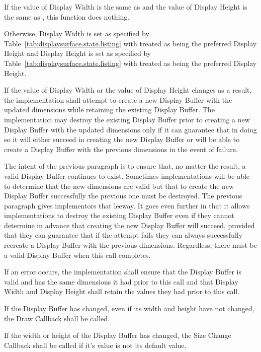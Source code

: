 \begin{itemdescr}
\pnum
\effects
If the value of Display Width is the same as  and the value of Display Height is the same as , this function does nothing.

\pnum
Otherwise, Display Width is set as specified by Table~\ref{tab:displaysurface.state.listing} with  treated as being the preferred Display Height and Display Height is set as specified by Table~\ref{tab:displaysurface.state.listing} with  treated as being the preferred Display Height.

\pnum
If the value of Display Width or the value of Display Height changes as a result, the implementation shall attempt to create a new Display Buffer with the updated dimensions while retaining the existing Display Buffer. The implementation may destroy the existing Display Buffer prior to creating a new Display Buffer with the updated dimensions only if it can guarantee that in doing so it will either succeed in creating the new Display Buffer or will be able to create a Display Buffer with the previous dimensions in the event of failure.

\pnum
\enternote
The intent of the previous paragraph is to ensure that, no matter the result, a valid Display Buffer continues to exist. Sometimes implementations will be able to determine that the new dimensions are valid but that to create the new Display Buffer successfully the previous one must be destroyed. The previous paragraph gives implementors that leeway. It goes even further in that it allows implementations to destroy the existing Display Buffer even if they cannot determine in advance that creating the new Display Buffer will succeed, provided that they can guarantee that if the attempt fails they can always successfully recreate a Display Buffer with the previous dimensions. Regardless, there must be a valid Display Buffer when this call completes.
\exitnote

\pnum
If an error occurs, the implementation shall ensure that the Display Buffer is valid and has the same dimensions it had prior to this call and that Display Width and Display Height shall retain the values they had prior to this call.

\pnum
If the Display Buffer has changed, even if its width and height have not changed, the Draw Callback shall be called.

\pnum
If the width or height of the Display Buffer has changed, the Size Change Callback shall be called if it's value is not its default value.


\end{itemdescr}
